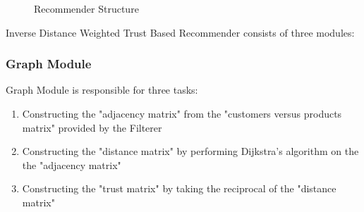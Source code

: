 \label{inverse_section}
\begin{figure}[H]
	\centering
	\caption{Recommender Structure}
	\label{fig:inverse_structure}
\end{figure}
Inverse Distance Weighted Trust Based Recommender consists of three modules:

\subsubsection{Graph Module} Graph Module is responsible for three tasks:
\begin{enumerate}
	\item Constructing the "adjacency matrix" from the "customers versus products matrix" provided by the Filterer
	\item Constructing the "distance matrix" by performing Dijkstra's algorithm on the the "adjacency matrix"
	\item Constructing the "trust matrix" by taking the reciprocal of the "distance matrix"
\end{enumerate}
